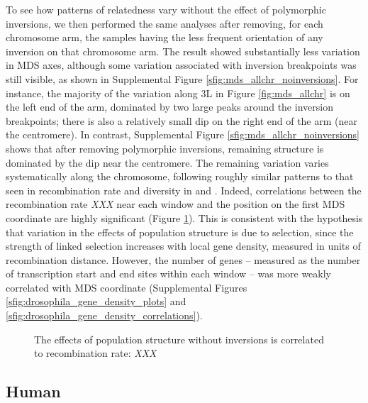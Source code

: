\documentclass[11pt, oneside]{article}   	%
\newcommand{\plr}[1]{{\em \color{blue} #1}}
\begin{document}
To see how patterns of relatedness vary without the effect of polymorphic inversions,
we then performed the same analyses after removing, for each chromosome arm,
the samples having the less frequent orientation of any inversion on that chromosome arm.
The result showed substantially less variation in MDS axes,
although some variation associated with inversion breakpoints was still visible,
as shown in Supplemental Figure \ref{sfig:mds_allchr_noinversions}.
For instance, the majority of the variation along 3L in Figure \ref{fig:mds_allchr}
is on the left end of the arm, dominated by two large peaks around the inversion breakpoints;
there is also a relatively small dip on the right end of the arm (near the centromere).
In contrast, Supplemental Figure \ref{sfig:mds_allchr_noinversions} shows that after removing polymorphic inversions,
remaining structure is dominated by the dip near the centromere.
The remaining variation varies systematically along the chromosome,
following roughly similar patterns to that seen in recombination rate and diversity in \citet{langley2012genomic} and \citet{mackay2012drosophila}.
Indeed, correlations between the recombination rate \plr{XXX} near each window and the position on the first MDS coordinate are highly significant
(Figure \ref{fig:drosophila_recomb_rate}).
This is consistent with the hypothesis that variation in the effects of population structure
is due to selection, since the strength of linked selection increases with local gene density, measured in units of recombination distance.
However, the number of genes -- measured as the number of transcription start and end sites within each window --
was more weakly correlated with MDS coordinate (Supplemental Figures \ref{sfig:drosophila_gene_density_plots} and \ref{sfig:drosophila_gene_density_correlations}).

\begin{figure}
    \begin{center}
    \end{center}
    \caption{
        The effects of population structure without inversions is correlated to recombination rate:
        \plr{XXX}
        \label{fig:drosophila_recomb_rate}
    }
\end{figure}


\subsection{Human}
\end{document}
